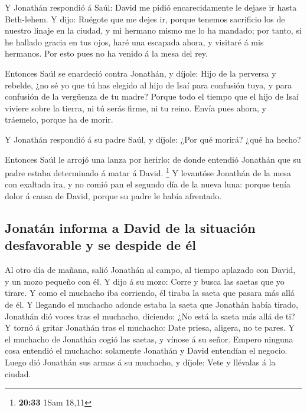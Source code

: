  Y Jonathán respondió á Saúl: David me pidió
encarecidamente le dejase ir hasta Beth-lehem.  Y dijo:
Ruégote que me dejes ir, porque tenemos sacrificio los de nuestro linaje
en la ciudad, y mi hermano mismo me lo ha mandado; por tanto, si he
hallado gracia en tus ojos, haré una escapada ahora, y visitaré á mis
hermanos. Por esto pues no ha venido á la mesa del rey.

 Entonces Saúl se enardeció contra Jonathán, y díjole: Hijo
de la perversa y rebelde, ¿no sé yo que tú has elegido al hijo de Isaí
para confusión tuya, y para confusión de la vergüenza de tu madre?
 Porque todo el tiempo que el hijo de Isaí viviere sobre la
tierra, ni tú serás firme, ni tu reino. Envía pues ahora, y tráemelo,
porque ha de morir.

 Y Jonathán respondió á su padre Saúl, y díjole: ¿Por qué
morirá? ¿qué ha hecho?

 Entonces Saúl le arrojó una lanza por herirlo: de donde
entendió Jonathán que su padre estaba determinado á matar á David.
\footnote{\textbf{20:33} 1Sam 18,11}  Y levantóse Jonathán
de la mesa con exaltada ira, y no comió pan el segundo día de la nueva
luna: porque tenía dolor á causa de David, porque su padre le había
afrentado.

\hypertarget{jonatuxe1n-informa-a-david-de-la-situaciuxf3n-desfavorable-y-se-despide-de-uxe9l}{%
\subsection{Jonatán informa a David de la situación desfavorable y se
despide de
él}\label{jonatuxe1n-informa-a-david-de-la-situaciuxf3n-desfavorable-y-se-despide-de-uxe9l}}

 Al otro día de mañana, salió Jonathán al campo, al tiempo
aplazado con David, y un mozo pequeño con él.  Y dijo á su
mozo: Corre y busca las saetas que yo tirare. Y como el muchacho iba
corriendo, él tiraba la saeta que pasara más allá de él.  Y
llegando el muchacho adonde estaba la saeta que Jonathán había tirado,
Jonathán dió voces tras el muchacho, diciendo: ¿No está la saeta más
allá de ti?  Y tornó á gritar Jonathán tras el muchacho:
Date priesa, aligera, no te pares. Y el muchacho de Jonathán cogió las
saetas, y vínose á su señor.  Empero ninguna cosa entendió
el muchacho: solamente Jonathán y David entendían el negocio.
 Luego dió Jonathán sus armas á su muchacho, y díjole: Vete
y llévalas á la ciudad.

